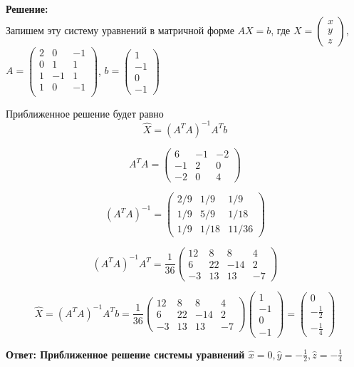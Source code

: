 \documentclass[a4paper,12pt]{article}
\newcounter{z}
\newcommand{\z}{\refstepcounter{z}\vskip 20pt\noindent
\fbox{\textbf{\arabic{z}}} }
\begin{document}
\begin{enumerate}
\textbf{Решение:}\\
Запишем эту систему уравнений в матричной форме $AX = b$, где $X=\begin{pmatrix}
x\\y\\z
\end{pmatrix}$, $A=\begin{pmatrix}
2&0&-1\\
0&1&1\\
1&-1&1\\
1&0&-1\\
\end{pmatrix}$, $b=\begin{pmatrix}
1\\-1\\0\\-1
\end{pmatrix}$

Приближенное решение будет равно 
\[ 
\widehat{X}= \left(A^T A\right)^{-1}A^T b
\]


$$A^T A= \begin{pmatrix}
6&-1&-2\\
-1&2&0\\
-2&0&4
\end{pmatrix}$$

\[ 
\left(A^T A\right)^{-1} = \begin{pmatrix}
2/9& 1/9& 1/9\\
1/9& 5/9& 1/18\\
1/9& 1/18& 11/36
\end{pmatrix}
\]

\[ 
\left(A^T A\right)^{-1}A^T = \frac{1}{36}\begin{pmatrix}
12&8&8&4\\
6&22&-14&2\\
-3&13&13&-7
\end{pmatrix}
\]

\[ 
\widehat{X}= \left(A^T A\right)^{-1}A^T b=\frac{1}{36}\begin{pmatrix}
12&8&8&4\\
6&22&-14&2\\
-3&13&13&-7
\end{pmatrix} \begin{pmatrix}
1\\-1\\0\\-1
\end{pmatrix} = \begin{pmatrix}
0\\
-\frac{1}{2}\\
-\frac{1}{4}
\end{pmatrix}
\]

\textbf{Ответ: Приближенное решение системы уравнений $\widehat{x}=0, \widehat{y}=-\frac{1}{2}, \widehat{z}=-\frac{1}{4}$}

\end{enumerate}
\end{document}
